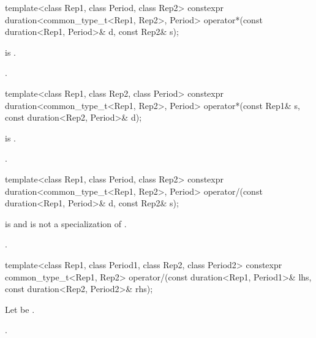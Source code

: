%
\begin{itemdecl}
template<class Rep1, class Period, class Rep2>
  constexpr duration<common_type_t<Rep1, Rep2>, Period>
    operator*(const duration<Rep1, Period>& d, const Rep2& s);
\end{itemdecl}

\begin{itemdescr}
\pnum
\constraints
{} is .

\pnum
\returns
{}.
\end{itemdescr}

%
\begin{itemdecl}
template<class Rep1, class Rep2, class Period>
  constexpr duration<common_type_t<Rep1, Rep2>, Period>
    operator*(const Rep1& s, const duration<Rep2, Period>& d);
\end{itemdecl}

\begin{itemdescr}
\pnum
\constraints
{} is .

\pnum
\returns
{}.
\end{itemdescr}

%
\begin{itemdecl}
template<class Rep1, class Period, class Rep2>
  constexpr duration<common_type_t<Rep1, Rep2>, Period>
    operator/(const duration<Rep1, Period>& d, const Rep2& s);
\end{itemdecl}

\begin{itemdescr}
\pnum
\constraints
{} is 
and  is not a specialization of .

\pnum
\returns
{}.
\end{itemdescr}

%
\begin{itemdecl}
template<class Rep1, class Period1, class Rep2, class Period2>
  constexpr common_type_t<Rep1, Rep2>
    operator/(const duration<Rep1, Period1>& lhs, const duration<Rep2, Period2>& rhs);
\end{itemdecl}

\begin{itemdescr}
\pnum
Let  be
.

\pnum
\returns
{}.
\end{itemdescr}

